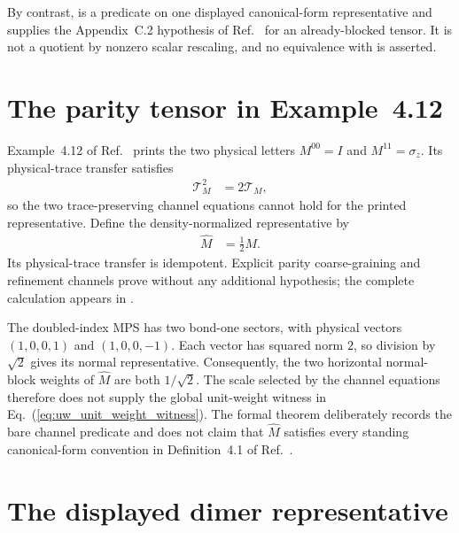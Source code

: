 \documentclass{article}
\begin{document}
By contrast,  is a predicate on one
displayed canonical-form representative and supplies the Appendix~C.2
hypothesis of Ref.~\cite{Cirac2016MPDO_arXiv} for an already-blocked tensor. It
is not a quotient by nonzero scalar rescaling, and no equivalence with
 is asserted.

\section{The parity tensor in Example~4.12}

Example~4.12 of Ref.~\cite{Cirac2016MPDO_arXiv} prints the two physical letters
$M^{00}=I$ and $M^{11}=\sigma_z$. Its physical-trace transfer satisfies
\begin{align}
    \mathcal T_M^2
    &=2\mathcal T_M,
    \label{eq:uw_parity_transfer_quasi_idempotence}
\end{align}
so the two trace-preserving channel equations cannot hold for the printed
representative. Define the density-normalized representative by
\begin{align}
    \widehat M
    &=\tfrac12 M.
    \label{eq:uw_parity_density_normalization}
\end{align}
Its physical-trace transfer is idempotent. Explicit parity coarse-graining and
refinement channels prove
 without any
additional hypothesis; the complete calculation appears in
.

The doubled-index MPS has two bond-one sectors, with physical vectors
$(1,0,0,1)$ and $(1,0,0,-1)$. Each vector has squared norm $2$, so division by
$\sqrt2$ gives its normal representative. Consequently, the two horizontal
normal-block weights of $\widehat M$ are both $1/\sqrt2$. The scale selected by
the channel equations therefore does not supply the global unit-weight witness
in Eq.~(\ref{eq:uw_unit_weight_witness}). The formal theorem deliberately
records the bare channel predicate and does not claim that $\widehat M$
satisfies every standing canonical-form convention in Definition~4.1 of
Ref.~\cite{Cirac2016MPDO_arXiv}.

\section{The displayed dimer representative}
\end{document}
